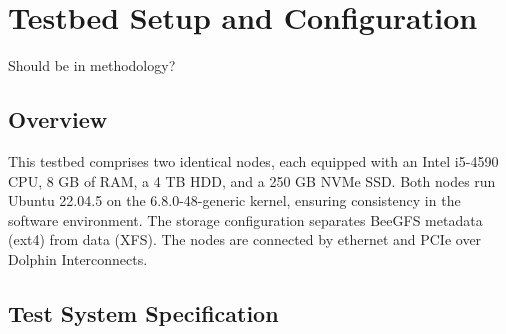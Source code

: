 \chapter{Testbed Setup and Configuration}
Should be in methodology?
\section{Overview}
This testbed comprises two identical nodes, each equipped with an Intel i5-4590 CPU, 8 GB of RAM, a 4 TB HDD, and a 250 GB NVMe SSD. Both nodes run Ubuntu 22.04.5 on the 6.8.0-48-generic kernel, ensuring consistency in the software environment. The storage configuration separates BeeGFS metadata (ext4) from data (XFS). The nodes are connected by ethernet and PCIe over Dolphin Interconnects.
\section{Test System Specification}
